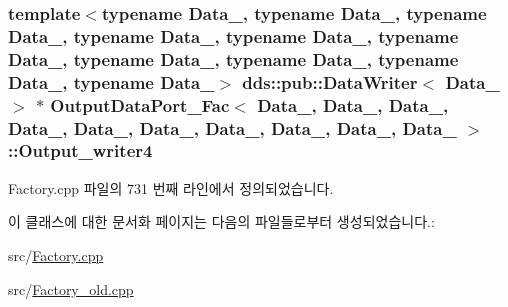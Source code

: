 \subsubsection[{\texorpdfstring{Output\+\_\+writer4}{Output_writer4}}]{\setlength{\rightskip}{0pt plus 5cm}template$<$typename Data\+\_, typename Data\+\_, typename Data\+\_, typename Data\+\_, typename Data\+\_, typename Data\+\_, typename Data\+\_, typename Data\+\_, typename Data\+\_, typename Data\+\_$>$ dds\+::pub\+::\+Data\+Writer$<$ Data\+\_ $>$ $\ast$ {\bf Output\+Data\+Port\+\_\+\+Fac}$<$ Data\+\_, Data\+\_, Data\+\_, Data\+\_, Data\+\_, Data\+\_, Data\+\_, Data\+\_, Data\+\_, Data\+\_ $>$\+::Output\+\_\+writer4}\hypertarget{classOutputDataPort__Fac_afed1a43ceb53aca5055a7178e06ff796}{}\label{classOutputDataPort__Fac_afed1a43ceb53aca5055a7178e06ff796}


Factory.\+cpp 파일의 731 번째 라인에서 정의되었습니다.



이 클래스에 대한 문서화 페이지는 다음의 파일들로부터 생성되었습니다.\+:\begin{DoxyCompactItemize}
\item 
src/\hyperlink{Factory_8cpp}{Factory.\+cpp}\item 
src/\hyperlink{Factory__old_8cpp}{Factory\+\_\+old.\+cpp}\end{DoxyCompactItemize}
